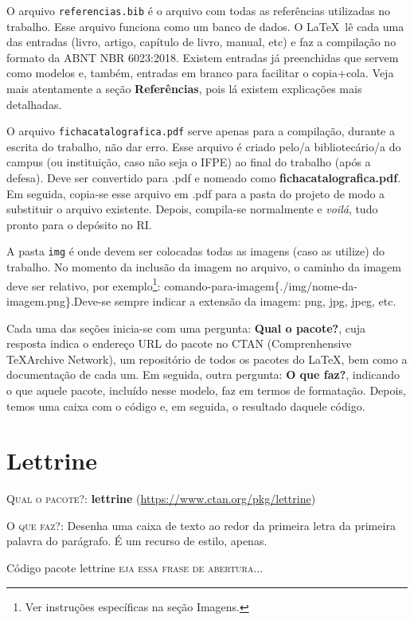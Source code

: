\documentclass[a4paper,12pt,oneside,openright,extrafontsizes,openbib]{memoir}
\begin{document}
{O arquivo \verb|referencias.bib| é o arquivo com todas as referências utilizadas no trabalho. Esse arquivo funciona como um banco de dados. O \LaTeX\ lê cada uma das entradas (livro, artigo, capítulo de livro, manual, etc) e faz a compilação no formato da ABNT NBR 6023:2018. Existem entradas já preenchidas que servem como modelos e, também, entradas em branco para facilitar o copia+cola. Veja mais atentamente a seção \textbf{Referências}, pois lá existem explicações mais detalhadas.

O arquivo \verb|fichacatalografica.pdf| serve apenas para a compilação, durante a escrita do trabalho, não dar erro. Esse arquivo é criado pelo/a bibliotecário/a do campus (ou instituição, caso não seja o IFPE) ao final do trabalho (após a defesa). Deve ser convertido para .pdf e nomeado como \textbf{fichacatalografica.pdf}. Em seguida, copia-se esse arquivo em .pdf para a pasta do projeto de modo a substituir o arquivo existente. Depois, compila-se normalmente e \textit{voilá}, tudo pronto para o depósito no RI.

A pasta \verb|img| é onde devem ser colocadas todas as imagens (caso as utilize) do trabalho. No momento da inclusão da imagem no arquivo, o caminho da imagem deve ser relativo, por exemplo\footnote{Ver instruções específicas na seção Imagens.}: comando-para-imagem\{./img/nome-da-imagem.png\}.Deve-se sempre  indicar a extensão da imagem: png, jpg, jpeg, etc.

Cada uma das seções inicia-se com uma pergunta: \textbf{Qual o pacote?}, cuja resposta indica o endereço URL do pacote no CTAN (Comprenhensive \TeX Archive Network), um repositório de todos os pacotes do \LaTeX, bem como a documentação de cada um. Em seguida, outra pergunta: \textbf{O que faz?}, indicando o que aquele pacote, incluído nesse modelo, faz em termos de formatação. Depois, temos uma caixa com o código e, em seguida, o resultado daquele código.
\chapter{Lettrine}

\textsc{Qual o pacote?}: \textbf{lettrine} (\url{https://www.ctan.org/pkg/lettrine})

\textsc{O que faz?}: Desenha uma caixa de texto ao redor da primeira letra da primeira palavra do parágrafo. É um recurso de estilo, apenas.

\begin{codex}{Código pacote lettrine}
\lettrine[findent=2pt]{}{eja essa frase de abertura...} \lipsum[1]
\end{codex}

}
\end{document}
